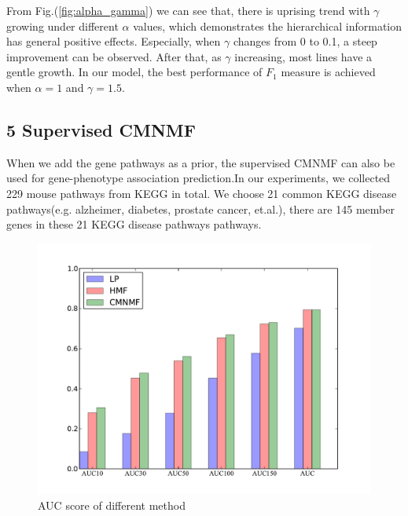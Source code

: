 \documentclass{bmcart}
\begin{document}
From Fig.(\ref{fig:alpha_gamma}) we can see that, there is uprising trend with $\gamma$ growing under different $\alpha$ values, which demonstrates the hierarchical information has general positive effects. Especially, when $\gamma$ changes from 0 to 0.1, a steep improvement can be observed. After that, as $\gamma$ increasing, most lines have a gentle growth. In our model, the best performance of $F_1$ measure is achieved when $\alpha=1$ and $\gamma = 1.5$.

\subsection*{\textbf{5 Supervised CMNMF}}
When we add the gene pathways as a prior, the supervised CMNMF can also be used for gene-phenotype association prediction.In our experiments, we collected 229 mouse pathways from KEGG in total. We choose 21 common KEGG disease pathways(e.g. alzheimer, diabetes, prostate cancer, et.al.), there are 145 member genes in these 21 KEGG disease pathways pathways.
\begin{figure}[!h]
  \begin{minipage}[t]{0.7\linewidth}
    \includegraphics[width=\linewidth,origin = l]{DrawPictures/AUC.pdf}
  \end{minipage}
  \caption{AUC score of different method} \label{fig:AUC}
\end{figure}
\end{document}
